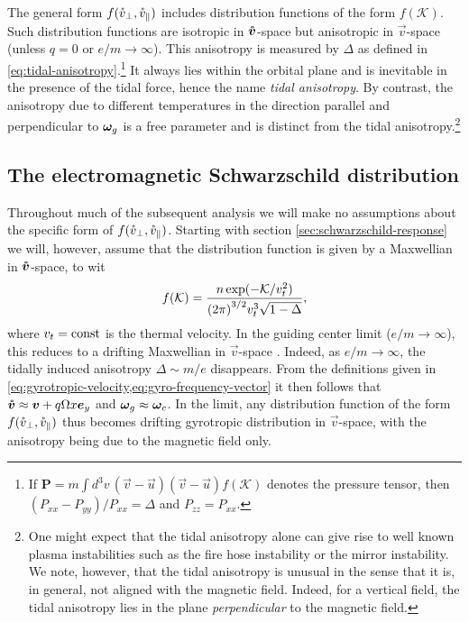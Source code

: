 \documentclass[aps,pre,notitlepage,amsmath,amssymb,amsfonts,nobibnotes,nofootinbib,superscriptaddress]{revtex4-1}
\begin{document}
The general form $f(\mathring{v}_\perp,\mathring{v}_\parallel)$ includes distribution functions
of the form $f(\mathcal{K})$. Such distribution functions are isotropic in
$\bm{\mathring{v}}$-space but anisotropic in $\vec{v}$-space (unless $q=0$ or
$e/m\to\infty$). This anisotropy is measured by $\Delta$ as defined in
\cref{eq:tidal-anisotropy}.\footnote{If
  $\mathbf{P}=m\int\!d^3v\,(\vec{v}-\vec{u})(\vec{v}-\vec{u})f(\mathcal{K})$
  denotes the pressure tensor, then $(P_{xx}-P_{yy})/P_{xx}=\Delta$ and
  $P_{zz}=P_{xx}$.} It always lies within the orbital plane and is inevitable
in the presence of the tidal force, hence the name \emph{tidal anisotropy}. By
contrast, the anisotropy due to different temperatures in the direction
parallel and perpendicular to $\bm{\omega}_g$ is a free parameter and is distinct from
the tidal anisotropy.\footnote{One might expect that the tidal anisotropy
  alone can give rise to well known plasma instabilities such as the fire hose
  instability or the mirror instability. We note, however, that the tidal
  anisotropy is unusual in the sense that it is, in general, not aligned with
  the magnetic field. Indeed, for a vertical field, the tidal anisotropy lies
  in the plane \emph{perpendicular} to the magnetic field.}

\subsection{The electromagnetic Schwarzschild distribution}

Throughout much of the subsequent analysis we will make no assumptions about
the specific form of $f(\mathring{v}_\perp,\mathring{v}_\parallel)$. Starting with section
\cref{sec:schwarzschild-response} we will, however, assume that the
distribution function is given by a Maxwellian in $\bm{\mathring{v}}$-space, to wit
\begin{equation}
  \label{em:schwarzschild}
  f(\mathcal{K}) =
  \frac{n\exp(-\mathcal{K}/\vt^2)}{{(2\pi)}^{3/2}\vt^3\sqrt{1-\Delta}},
\end{equation}
where $v_t=\mathrm{const}$ is the thermal velocity. In the guiding center
limit ($e/m\to\infty$), this reduces to a drifting Maxwellian in
$\vec{v}$-space \citep[as used in e.g.][]{Quataert2002}. Indeed, as
$e/m\to\infty$, the tidally induced anisotropy $\Delta\sim{}m/e$ disappears.
From the definitions given in
\cref{eq:gyrotropic-velocity,eq:gyro-frequency-vector} it then follows that
$\bm{\mathring{v}}\approx\bm{v}+q\Omega{}x\bm{e}_y$ and $\bm{\omega}_g\approx\bm{\omega}_c$. In the limit, any
distribution function of the form $f(\mathring{v}_\perp,\mathring{v}_\parallel)$ thus becomes
drifting gyrotropic distribution in $\vec{v}$-space, with the anisotropy being
due to the magnetic field only.
\end{document}

